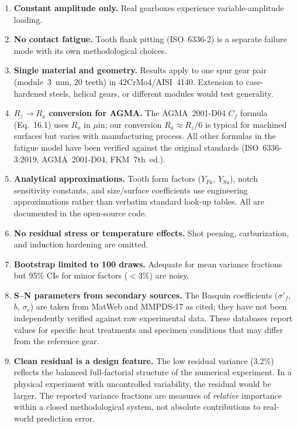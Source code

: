 \documentclass[12pt,a4paper]{article}
\begin{document}
\begin{enumerate}
  \item \textbf{Constant amplitude only.} Real gearboxes experience
        variable-amplitude loading.
  \item \textbf{No contact fatigue.} Tooth flank pitting (ISO~6336-2)
        is a separate failure mode with its own methodological choices.
  \item \textbf{Single material and geometry.} Results apply to one
        spur gear pair (module~3~mm, 20 teeth) in 42CrMo4/AISI~4140.
        Extension to case-hardened steels, helical gears, or different
        modules would test generality.
  \item \textbf{$R_z \rightarrow R_a$ conversion for AGMA.} The
        AGMA~2001-D04 $C_f$ formula (Eq.~16.1) uses $R_a$ in $\mu$in;
        our conversion $R_a \approx R_z/6$ is typical for machined
        surfaces but varies with manufacturing process. All other formulas
        in the fatigue model have been verified against the original
        standards (ISO~6336-3:2019, AGMA~2001-D04, FKM~7th~ed.).
  \item \textbf{Analytical approximations.} Tooth form factors
        ($Y_{Fa}$, $Y_{Sa}$), notch sensitivity constants, and
        size/surface coefficients use engineering approximations rather
        than verbatim standard look-up tables. All are documented in the
        open-source code.
  \item \textbf{No residual stress or temperature effects.} Shot peening,
        carburization, and induction hardening are omitted.
  \item \textbf{Bootstrap limited to 100 draws.} Adequate for mean
        variance fractions but 95\% CIs for minor factors ($<3\%$) are
        noisy.
  \item \textbf{S--N parameters from secondary sources.} The Basquin
        coefficients ($\sigma'_f$, $b$, $\sigma_e$) are taken from MatWeb
        and MMPDS-17 as cited; they have not been independently verified
        against raw experimental data. These databases report values for
        specific heat treatments and specimen conditions that may differ
        from the reference gear.
  \item \textbf{Clean residual is a design feature.} The low residual
        variance (3.2\%) reflects the balanced full-factorial structure of
        the numerical experiment. In a physical experiment with
        uncontrolled variability, the residual would be larger. The
        reported variance fractions are measures of \emph{relative}
        importance within a closed methodological system, not absolute
        contributions to real-world prediction error.
\end{enumerate}
\end{document}
